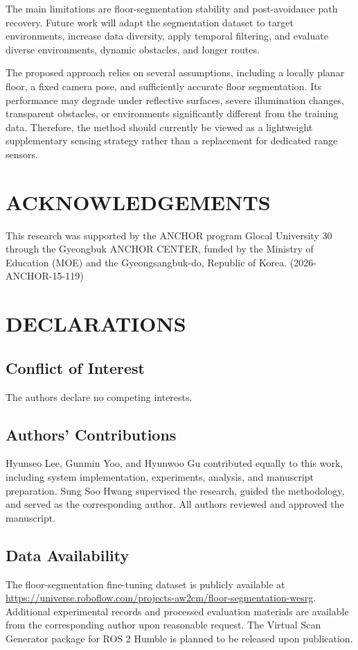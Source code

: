 \documentclass{IJCAS}
\begin{document}
The main limitations are floor-segmentation stability and post-avoidance path recovery. Future work will adapt the segmentation dataset to target environments, increase data diversity, apply temporal filtering, and evaluate diverse environments, dynamic obstacles, and longer routes.

The proposed approach relies on several assumptions, including a locally planar floor, a fixed camera pose, and sufficiently accurate floor segmentation. Its performance may degrade under reflective surfaces, severe illumination changes, transparent obstacles, or environments significantly different from the training data. Therefore, the method should currently be viewed as a lightweight supplementary sensing strategy rather than a replacement for dedicated range sensors.


\section*{ACKNOWLEDGEMENTS}
This research was supported by the ANCHOR program Glocal University 30 through the Gyeongbuk ANCHOR CENTER, funded by the Ministry of Education (MOE) and the Gyeongsangbuk-do, Republic of Korea. (2026-ANCHOR-15-119)


\section*{DECLARATIONS}

\subsection*{Conflict of Interest}
The authors declare no competing interests.

\subsection*{Authors' Contributions}
Hyunseo Lee, Gunmin Yoo, and Hyunwoo Gu contributed equally to this work, including system implementation, experiments, analysis, and manuscript preparation. Sung Soo Hwang supervised the research, guided the methodology, and served as the corresponding author. All authors reviewed and approved the manuscript.

\subsection*{Data Availability}
The floor-segmentation fine-tuning dataset is publicly available at \url{https://universe.roboflow.com/projects-aw2cm/floor-segmentation-wesrg}. Additional experimental records and processed evaluation materials are available from the corresponding author upon reasonable request. The Virtual Scan Generator package for ROS 2 Humble is planned to be released upon publication.
\end{document}
